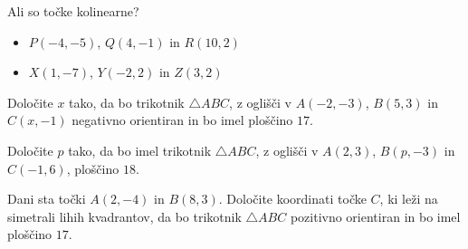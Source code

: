         \begin{naloga}
            Ali so točke kolinearne?
            \begin{itemize}
                \item $P(-4,-5)$, $Q(4,-1)$ in $R(10,2)$ 
                \item $X(1,-7)$, $Y(-2,2)$ in $Z(3,2)$ 
            \end{itemize}
        \end{naloga}


        \begin{naloga}
            Določite $x$ tako, da bo trikotnik $\triangle ABC$, z oglišči v $A(-2,-3)$, $B(5,3)$ in $C(x,-1)$ negativno orientiran 
            in bo imel ploščino $17$. 
        \end{naloga}
       
        \begin{naloga}
            Določite $p$ tako, da bo imel trikotnik $\triangle ABC$, z oglišči v $A(2,3)$, $B(p,-3)$ in $C(-1,6)$, ploščino $18$. 
        \end{naloga}

        \begin{naloga}
            Dani sta točki $A(2,-4)$ in $B(8,3)$. Določite koordinati točke $C$, ki leži na simetrali lihih kvadrantov, 
            da bo trikotnik $\triangle ABC$ pozitivno orientiran in bo imel ploščino $17$.
        \end{naloga}


